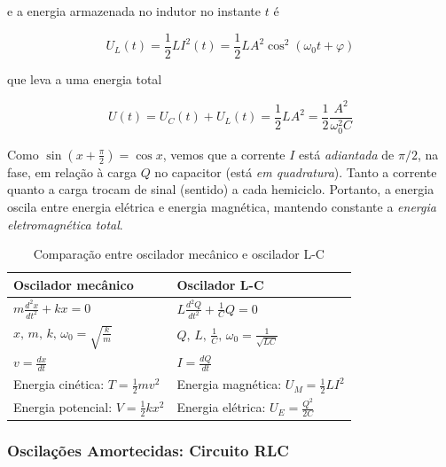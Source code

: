\documentclass[12pt]{article}
\begin{document}
\noindent e a energia armazenada no indutor no instante \(t\) é

\begin{equation}
    \boxed{U_L(t) = \frac{1}{2}LI^2(t) = \frac{1}{2}LA^2 \cos^2(\omega_0 t + \varphi)}
\end{equation}

\noindent que leva a uma energia total 

\begin{equation}
    \boxed{U(t) = U_C(t) + U_L(t) = \frac{1}{2}LA^2 = \frac{1}{2}\frac{A^2}{\omega_0^2 C}}
\end{equation}

Como \(\sin(x + \frac{\pi}{2}) = \cos x\), vemos que a corrente \(I\) está \emph{adiantada} de \(\pi/2\), na fase, em relação à carga \(Q\) no capacitor (está \emph{em quadratura}). Tanto a corrente quanto a carga trocam de sinal (sentido) a cada hemiciclo. Portanto, a energia oscila entre energia elétrica e energia magnética, mantendo constante a \emph{energia eletromagnética total}.

\begin{table}[h]
\centering
\caption{Comparação entre oscilador mecânico e oscilador L-C}
\label{tab:osciladores}
\begin{tabular}{l l}
\toprule
\textbf{Oscilador mecânico} & \textbf{Oscilador L-C} \\
\midrule
$\displaystyle m \frac{d^2 x}{dt^2} + kx = 0$ & $\displaystyle L \frac{d^2 Q}{dt^2} + \frac{1}{C} Q = 0$ \\
$\displaystyle x, \, m, \, k, \, \omega_0 = \sqrt{\frac{k}{m}}$ & $\displaystyle Q, \, L, \, \frac{1}{C}, \, \omega_0 = \frac{1}{\sqrt{LC}}$ \\
$\displaystyle v = \frac{dx}{dt}$ & $\displaystyle I = \frac{dQ}{dt}$ \\
Energia cinética: $\displaystyle T = \frac{1}{2} mv^2$ & Energia magnética: $\displaystyle U_M = \frac{1}{2} LI^2$ \\
Energia potencial: $\displaystyle V = \frac{1}{2} kx^2$ & Energia elétrica: $\displaystyle U_E = \frac{Q^2}{2C}$ \\
\bottomrule
\end{tabular}
\end{table}

\subsubsection{Oscilações Amortecidas: Circuito RLC}
\end{document}
